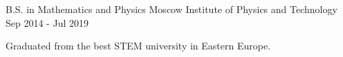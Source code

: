 
\begin{cventries}

  \cventry
    {B.S. in Mathematics and Physics}
    {Moscow Institute of Physics and Technology}
    {}
    {Sep 2014 - Jul 2019}
    {
      \begin{cvitems}
        Graduated from the best STEM university in Eastern Europe.
      \end{cvitems}
    }

\end{cventries}
